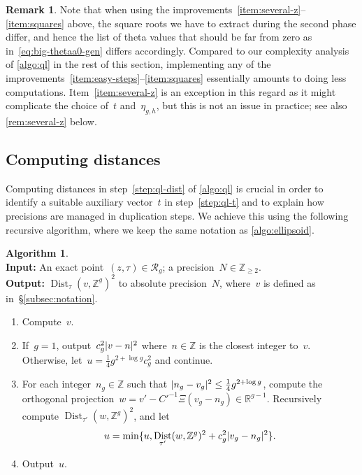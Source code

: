 \documentclass[12pt,oneside]{amsart}
\numberwithin{equation}{section}
\theoremstyle{definition}
\newtheorem{rem}[equation]{Remark}
\newtheorem{algorithm}[equation]{Algorithm}
\newcommand{\algoinput}[1]{~\\ \noindent\textbf{Input:} #1}
\newcommand{\algooutput}[1]{~\\ \noindent\textbf{Output:} #1}
\newcommand{\Z}{\mathbb{Z}}
\newcommand{\R}{\mathbb{R}}
\newcommand{\red}{\mathcal{R}}
\DeclareMathOperator{\Dist}{Dist}
\DeclarePairedDelimiter{\abs}{|}{|}
\begin{document}
\begin{rem}
Note that when using the
improvements~\eqref{item:several-z}--\eqref{item:squares} above, the square
roots we have to extract during the second phase differ, and hence the list of
theta values that should be far from zero as in~\eqref{eq:big-thetaa0-gen}
differs accordingly. Compared to our complexity analysis of \cref{algo:ql} in
the rest of this section, implementing any of the
improvements~\eqref{item:easy-steps}--\eqref{item:squares} essentially amounts
to doing less computations. Item~\eqref{item:several-z} is an exception in this
regard as it might complicate the choice of~$t$ and~$\eta_{g,h}$, but this is
not an issue in practice; see also \cref{rem:several-z} below.
\end{rem}

\subsection{Computing distances}
\label{subsec:distances}

Computing distances in step~\eqref{step:ql-dist} of \cref{algo:ql} is crucial
in order to identify a suitable auxiliary vector~$t$ in step~\eqref{step:ql-t}
and to explain how precisions are managed in duplication steps. We achieve this
using the following recursive algorithm, where we keep the same notation as
\cref{algo:ellipsoid}.

\begin{algorithm}
  \label{algo:dist}
  \algoinput{An exact point~$(z,\tau)\in \red_g$; a
    precision~$N\in \Z_{\geq 2}$.}  \algooutput{$\Dist_\tau(v, \Z^g)^2$ to
    absolute precision~$N$, where~$v$ is defined as in~§\ref{subsec:notation}.}
  \begin{enumerate}
  \item Compute~$v$.
  \item \label{step:dist-start} If~$g=1$, output~$c_g^2\abs{v - n}^2$
    where~$n\in \Z$ is the closest integer to~$v$. Otherwise,
    let~$u = \frac14 g^{2+\log g}c_g^2$ and continue.
  \item \label{step:dist-enum} For each integer~$n_g\in \Z$ such that
    $\abs{n_g - v_g}^2 \leq \frac14 g^{2+ \log g}$, compute the orthogonal
    projection~$w = v' - C'^{-1}\Xi(v_g - n_g)\in \R^{g-1}$. Recursively
    compute $\Dist_{\tau'}(w, \Z^g)^2$, and let
    \begin{displaymath}
      u = \min\{u, \Dist_{\tau'}(w,\Z^g)^2 + c_g^2 \abs{v_g - n_g}^2\}.
    \end{displaymath}
  \item Output~$u$.
  \end{enumerate}
\end{algorithm}
\end{document}
